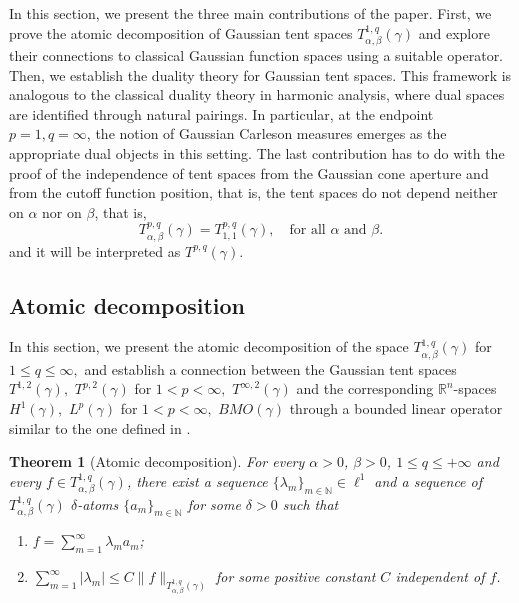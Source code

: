 \documentclass[leqno,11pt]{amsart}
\theoremstyle{plain}
\newtheorem{teo}{Theorem}
\theoremstyle{remark}
\begin{document}
{In this section, we present the three main contributions of the paper. First, we prove the atomic decomposition of Gaussian tent spaces \( T^{1,q}_{\alpha, \beta}(\gamma) \) and explore their connections to classical Gaussian function spaces using a suitable operator. Then, we establish the duality theory for Gaussian tent spaces. This framework is analogous to the classical duality theory in harmonic analysis, where dual spaces are identified through natural pairings. In particular, at the endpoint \( p = 1, q = \infty \), the notion of Gaussian Carleson measures emerges as the appropriate dual objects in this setting. The last contribution has to do with the proof of the independence of tent spaces from the Gaussian cone aperture and from the cutoff function position, that is, the tent spaces do not depend neither on \( \alpha \) nor on \( \beta \), that is,
\[
T^{p,q}_{\alpha, \beta}(\gamma) = T^{p,q}_{1, 1}(\gamma), \quad \text{for all } \alpha \text{ and } \beta.
\] and it will be interpreted as $T^{p,q}(\gamma).$

\subsection{Atomic decomposition}\label{atomic}

In this section, we present the atomic decomposition of the space $T^{1,q}_{\alpha, \beta}(\gamma)$ for $1\le q \le \infty,$ and establish a connection between the Gaussian tent spaces $T^{1,2}(\gamma),$ $T^{p,2}(\gamma)$ for $1<p<\infty,$ $T^{\infty,2}(\gamma)$ and the corresponding $\mathbb{R}^n$-spaces $H^1(\gamma),$ $L^p(\gamma)$ for $1<p<\infty,$ $BMO(\gamma)$ through a bounded linear operator similar to the one defined in \cite{cms}.

\begin{teo}[Atomic decomposition]\label{teo: descomposicion atomica} For every $\alpha>0$, $\beta>0$, $ 1\le q \le +\infty $ and every $f\in T_{\alpha, \beta}^{1,q}(\gamma)$, there exist a sequence $\{\lambda_m\}_{m\in \mathbb{N}}\in \ell^1$ and a sequence of $T^{1,q}_{\alpha, \beta}(\gamma)$ $\delta$-atoms $\{a_m\}_{m\in \mathbb{N}}$ for some $\delta>0$ such that
\begin{enumerate}
    \item $f=\sum_{m=1}^\infty \lambda_m a_m$;
    \item $\sum_{m=1}^\infty |\lambda_m|\leq C\|f\|_{T_{\alpha,\beta}^{1,q}(\gamma)}$ for some positive constant $C$ independent of $f$.
\end{enumerate}
\end{teo}

}
\end{document}
